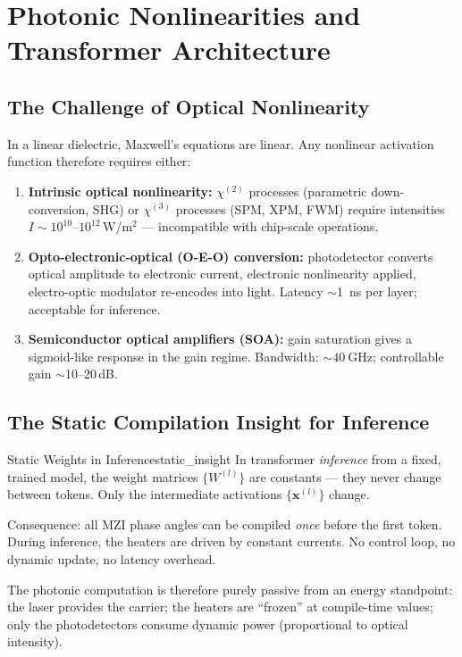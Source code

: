 \documentclass[12pt, a4paper]{article}
\begin{document}
\section{Photonic Nonlinearities and Transformer Architecture}
\label{sec:nonlinear}

\subsection{The Challenge of Optical Nonlinearity}

In a linear dielectric, Maxwell's equations are linear.
Any nonlinear activation function therefore requires either:
\begin{enumerate}
  \item \textbf{Intrinsic optical nonlinearity:}
    $\chi^{(2)}$ processes (parametric down-conversion, SHG) or
    $\chi^{(3)}$ processes (SPM, XPM, FWM) require intensities
    $I \sim 10^{10}$--$10^{12}$\,W/m$^2$ — incompatible with chip-scale
    operations.
  \item \textbf{Opto-electronic-optical (O-E-O) conversion:}
    photodetector converts optical amplitude to electronic current,
    electronic nonlinearity applied, electro-optic modulator re-encodes
    into light.
    Latency $\sim$\SI{1}{\nano\second} per layer; acceptable for inference.
  \item \textbf{Semiconductor optical amplifiers (SOA):}
    gain saturation gives a sigmoid-like response in the gain regime.
    Bandwidth: $\sim\SI{40}{\giga\hertz}$; controllable gain $\sim$10--20\,dB.
\end{enumerate}

\subsection{The Static Compilation Insight for Inference}
\label{ssec:static}

\begin{insight}{Static Weights in Inference}{static_insight}
  In transformer \emph{inference} from a fixed, trained model, the weight matrices
  $\{W^{(l)}\}$ are constants — they never change between tokens.
  Only the intermediate activations $\{\mathbf{x}^{(l)}\}$ change.

  Consequence: all MZI phase angles can be compiled \emph{once} before the
  first token.
  During inference, the heaters are driven by constant currents.
  No control loop, no dynamic update, no latency overhead.

  The photonic computation is therefore purely passive from an energy standpoint:
  the laser provides the carrier; the heaters are ``frozen'' at compile-time
  values; only the photodetectors consume dynamic power (proportional to
  optical intensity).
\end{insight}
\end{document}
